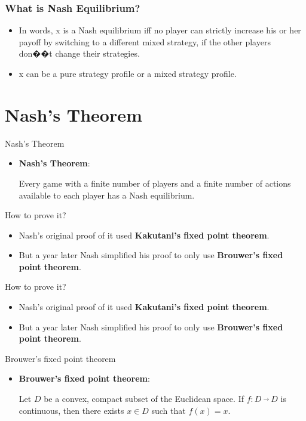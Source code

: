 \documentclass{beamer}
\begin{document}
\begin{frame}
\frametitle{What is Nash Equilibrium?}
\begin{itemize}
\item
In words, x is a Nash equilibrium iff no player can strictly increase his or her payoff by switching to
a different mixed strategy, if the other players don��t change their strategies.
\item x can be a pure strategy profile or a mixed strategy profile.
\end{itemize}
\end{frame}


\section{Nash's Theorem}
\begin{frame}{Nash's Theorem}
	\begin{itemize}[]
		\item \textbf{\large Nash's Theorem}:
		
		\qquad Every game with a finite number of players and a finite number of actions
		available to each player has a Nash equilibrium.
	\end{itemize}
\end{frame}

\begin{frame}[fragile]{How to prove it?}
\begin{itemize}[<+->]
	\item Nash's original proof of it used \textbf{Kakutani's fixed point theorem}.
	\item But a year later Nash simplified his proof to only use \textbf{Brouwer's fixed point theorem}.
\end{itemize}
\end{frame}

\begin{frame}[fragile]{How to prove it?}
	\begin{itemize}
		\item Nash's original proof of it used \textbf{Kakutani's fixed point theorem}.
		\item But a year later Nash simplified his proof to only use \textbf{\color{red}\large Brouwer's fixed point theorem}.
	\end{itemize}
\end{frame}

\begin{frame}[fragile]{Brouwer's fixed point theorem}
	\begin{itemize}
		\item \textbf{\large Brouwer's fixed point theorem}:
		
		\qquad Let $D$ be a convex, compact subset of the Euclidean space. If $f : D\  \overrightarrow{}\ D$ is
		continuous, then there exists $x \in D$ such that $f (x) = x$.
	\end{itemize}
\end{frame}
\end{document}
